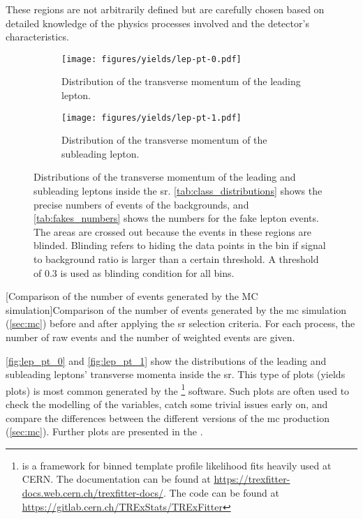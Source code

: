 These regions are not arbitrarily defined but are carefully chosen based on detailed knowledge of the physics processes
involved and the detector's characteristics.

\begin{figure}[htb]
    \centering
    \begin{subfigure}{0.45\textwidth}
        \texttt{[image: figures/yields/lep-pt-0.pdf]}
        \caption{Distribution of the transverse momentum of the leading lepton.}
        \label{fig:lep_pt_0}
    \end{subfigure}\hfill%
    \begin{subfigure}{0.45\textwidth}
        \texttt{[image: figures/yields/lep-pt-1.pdf]}
        \caption{Distribution of the transverse momentum of the subleading lepton.}
        \label{fig:lep_pt_1}
    \end{subfigure}
    \caption[Distributions of the transverse momentum of the leading and subleading leptons inside the Signal Region.]
    {Distributions of the transverse momentum of the leading and subleading leptons inside the \gls{sr}.
        \autoref{tab:class_distributions} shows the precise numbers of events of the backgrounds, and
        \autoref{tab:fakes_numbers} shows the numbers for the fake lepton events. The areas are crossed out because the
        events in these regions are blinded.  Blinding refers to hiding the data points in the bin if signal to
        background ratio is larger than a certain threshold. A threshold of $0.3$ is used as blinding condition for
        all bins.} \end{figure}

\begin{table}[htb]
    \centering
    
    [Comparison of the number of events generated by the MC simulation]{Comparison of the number of
        events generated by the \gls{mc} simulation (\autoref{sec:mc}) before and after applying the \gls{sr} selection
        criteria. For each process, the number of raw events
        and the number of weighted events are given.}
    \label{tab:class_distributions}
\end{table}


\autoref{fig:lep_pt_0} and \autoref{fig:lep_pt_1} show the distributions of the leading and
subleading leptons' transverse momenta inside the \gls{sr}. This type of plots (yields plots) is most common
generated by the \trex\footnote{\trex is a framework for binned template profile likelihood fits
    heavily used at CERN. The documentation can be found at \url{https://trexfitter-docs.web.cern.ch/trexfitter-docs/}.
    The code can be found at \url{https://gitlab.cern.ch/TRExStats/TRExFitter}} software. Such plots are often used to
check the modelling of the variables, catch some trivial issues early on, and compare the differences between
the different versions of the \gls{mc} production (\autoref{sec:mc}). Further plots are presented in the
.


